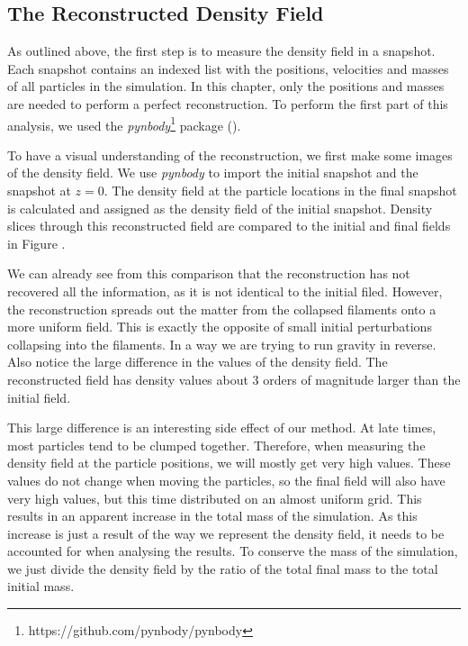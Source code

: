 
\subsection{The Reconstructed Density Field}

As outlined above, the first step is to measure the density field in a snapshot. Each snapshot contains an indexed list with the positions, velocities and masses of all particles in the simulation. In this chapter, only the positions and masses are needed to perform a perfect reconstruction. To perform the first part of this analysis, we used the \textit{pynbody}\footnote{https://github.com/pynbody/pynbody} package (\cite{2013ascl.soft05002P}). 

To have a visual understanding of the reconstruction, we first make some images of the density field. We use \textit{pynbody} to import the initial snapshot and the snapshot at $z=0$. The density field at the particle locations in the final snapshot is calculated and assigned as the density field of the initial snapshot. Density slices through this reconstructed field are compared to the initial and final fields in Figure . 

We can already see from this comparison that the reconstruction has not recovered all the information, as it is not identical to the initial filed. However, the reconstruction spreads out the matter from the collapsed filaments onto a more uniform field. This is exactly the opposite of small initial perturbations collapsing into the filaments. In a way we are trying to run gravity in reverse. Also notice the large difference in the values of the density field. The reconstructed field has density values about 3 orders of magnitude larger than the initial field.


This large difference is an interesting side effect of our method. At late times, most particles tend to be clumped together. Therefore, when measuring the density field at the particle positions, we will mostly get very high values. These values do not change when moving the particles, so the final field will also have very high values, but this time distributed on an almost uniform grid. This results in an apparent increase in the total mass of the simulation. As this increase is just a result of the way we represent the density field, it needs to be accounted for when analysing the results. To conserve the mass of the simulation, we just divide the density field by the ratio of the total final mass to the total initial mass.

